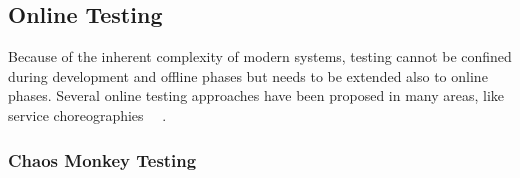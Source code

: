 %

\subsection{Online Testing}
Because of the inherent complexity of modern systems, testing cannot be confined during development and offline phases but needs to be extended also to online phases. %
Several online testing approaches have been proposed in many areas, like service choreographies~\cite{Ali2014,Bertolino2012} ~\cite{Seaman2008,Binder1994,Wang2002,Canini2011}. %


\subsubsection{Chaos Monkey Testing}

